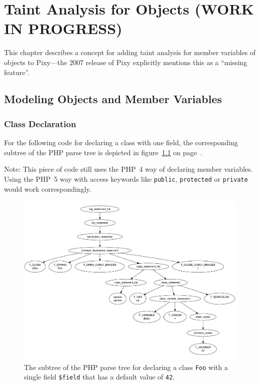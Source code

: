 \chapter{Taint Analysis for Objects (WORK IN PROGRESS)}
\label{field-tainting}

This chapter describes a concept for adding taint analysis for member variables of objects to Pixy---the 2007 release of Pixy explicitly mentions this as a ``missing feature''.


\section{Modeling Objects and Member Variables}


\subsection{Class Declaration}

For the following code for declaring a class with one field, the corresponding subtree of the PHP parse tree is depicted in figure~\ref{fig:parse-tree-foo-class} on page~\pageref{fig:parse-tree-foo-class}.


Note: This piece of code still uses the PHP~4 way of declaring member variables. Using the PHP~5 way with access keywords like \texttt{public}, \texttt{protected} or \texttt{private} would work correspondingly.

\begin{figure}[htb]
  \begin{center}
    \includegraphics[scale=0.5]{images/parsetree-foo-class-declaration}
   \caption{The subtree of the PHP parse tree for declaring a class \texttt{Foo} with a single field \texttt{\$field} that has a default value of \texttt{42}.}
   \label{fig:parse-tree-foo-class}
  \end{center}
\end{figure}

